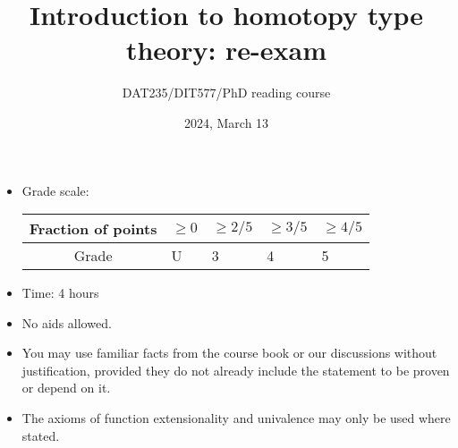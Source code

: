 \documentclass[11pt]{article}
\begin{document}
\title{Introduction to homotopy type theory: re-exam}
\author{DAT235/DIT577/PhD reading course}
\date{2024, March 13}

\maketitle

\begin{itemize}
\item
Grade scale:\qquad
\begin{tabularx}{10cm}{|c|Y|Y|Y|Y|}
  \hline
  Fraction of points & $\geq 0$ & $\geq 2/5$ & $\geq 3/5$ & $\geq 4/5$
  \\\hline
  Grade & U & 3 & 4 & 5
  \\\hline
\end{tabularx}
\item
Time: 4 hours
\item
No aids allowed.
\item
You may use familiar facts from the course book or our discussions without justification, provided they do not already include the statement to be proven or depend on it.
\item
The axioms of function extensionality and univalence may only be used where stated. 
\end{itemize}

\newpage
\end{document}
